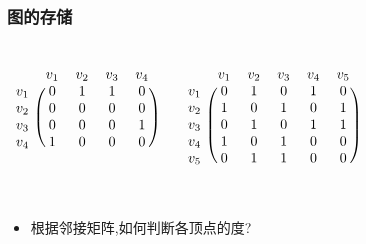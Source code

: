 \begin{frame}[fragile]
  \frametitle{图的存储}
  \small
  \begin{columns}[T]
    \[
      \begin{blockarray}{ccccc}
         & v_1 & v_2 & v_3 & v_4 \\
        \begin{block}{c (c c c c)}
          v_1 & 0 & 1 & 1 & 0 \\
          v_2 & 0 & 0 & 0 & 0 \\
          v_3 & 0 & 0 & 0 & 1 \\
          v_4 & 1 & 0 & 0 & 0 \\
        \end{block}
      \end{blockarray}
    \]


    \[
      \begin{blockarray}{cccccc}
         & v_1 & v_2 & v_3 & v_4 & v_5 \\
        \begin{block}{c (c c c c c)}
          v_1 & 0 & 1 & 0 & 1 & 0 \\
          v_2 & 1 & 0 & 1 & 0 & 1 \\
          v_3 & 0 & 1 & 0 & 1 & 1 \\
          v_4 & 1 & 0 & 1 & 0 & 0 \\
          v_5 & 0 & 1 & 1 & 0 & 0 \\
        \end{block}
      \end{blockarray}
    \]    
  \end{columns}
  
  \begin{itemize}
  \item 根据邻接矩阵,如何判断各顶点的度?
  \end{itemize}
\end{frame}

